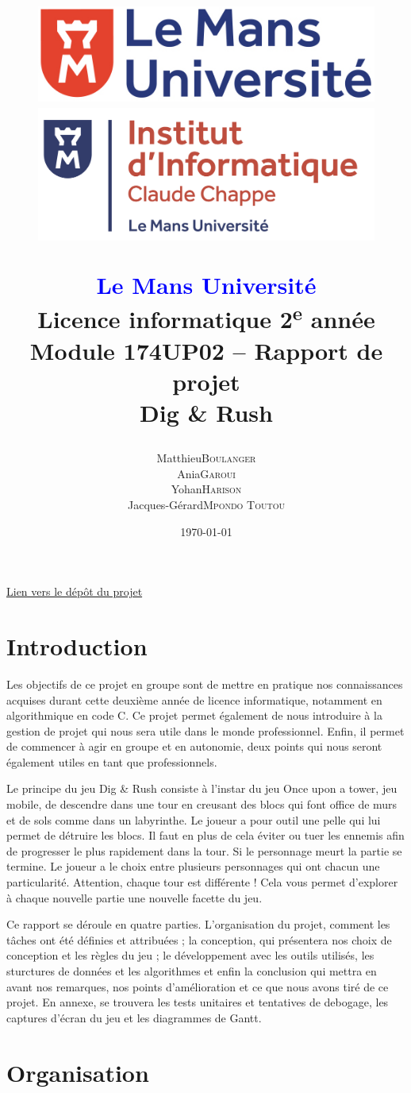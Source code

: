 \documentclass[a4paper,12pt]{article}
\title{
    \begin{figure}[!t]
	\begin{minipage}{.25\textwidth}
	    \includegraphics[width=\textwidth]{img/logo_lmu.png}
	\end{minipage}
	\hspace{.5\textwidth}
	\begin{minipage}{.25\textwidth}
	    \includegraphics[width=\textwidth]{img/logo_ic2.png}
	\end{minipage}
    \end{figure}
    \begin{center}
	\textbf{\textcolor{blue}{Le Mans Université}} \\
	Licence informatique 2\textsuperscript{e} année \\
	Module 174UP02 – Rapport de projet \\
	\textbf{Dig \& Rush}
    \end{center}
}
\author{
	\begin{tabular}{rl}
	    Matthieu & \textsc{Boulanger} \\
	    Ania & \textsc{Garoui} \\
	    Yohan & \textsc{Harison} \\
	    Jacques-Gérard & \textsc{Mpondo Toutou}
	\end{tabular}
}
\date{\today}
\begin{document}
\maketitle
\begin{center}
    \href{https://github.com/idlusen/dig-and-rush/}{Lien vers le dépôt du projet}
\end{center}
\newpage

\tableofcontents
\newpage


\section{Introduction}

Les objectifs de ce projet en groupe sont de mettre en pratique nos connaissances acquises durant cette deuxième année de licence informatique, notamment en algorithmique en code C.
Ce projet permet également de nous introduire à la gestion de projet qui nous sera utile dans le monde professionnel. 
Enfin, il permet de commencer à agir en groupe et en autonomie, deux points qui nous seront également utiles en tant que professionnels.

Le principe du jeu Dig \& Rush consiste à l’instar du jeu Once upon a tower, jeu mobile, de descendre dans une tour en creusant des blocs qui font office de murs et de sols comme dans un labyrinthe. 
Le joueur a pour outil une pelle qui lui permet de détruire les blocs. 
Il faut en plus de cela éviter ou tuer les ennemis afin de progresser le plus rapidement dans la tour. 
Si le personnage meurt la partie se termine. Le joueur a le choix entre plusieurs personnages qui ont chacun une particularité.
Attention, chaque tour est différente ! Cela vous permet d’explorer à chaque nouvelle partie une nouvelle facette du jeu.

Ce rapport se déroule en quatre parties. 
L’organisation du projet, comment les tâches ont été définies et attribuées ; la conception, qui présentera nos choix de conception et les règles du jeu ; le développement avec les outils utilisés, les sturctures de données et les algorithmes et enfin la conclusion qui mettra en avant nos remarques, nos points d’amélioration et ce que nous avons tiré de ce projet. 
En annexe, se trouvera les tests unitaires et tentatives de debogage, les captures d’écran du jeu et les diagrammes de Gantt.

\newpage
\section{Organisation}
\end{document}
